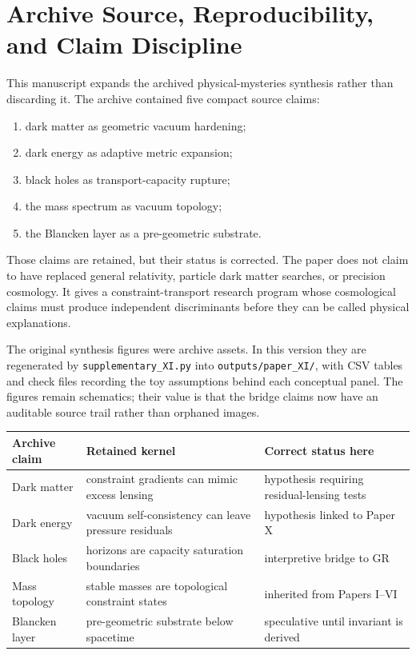\documentclass[11pt]{article}
\begin{document}
\section{Archive Source, Reproducibility, and Claim Discipline}

This manuscript expands the archived physical-mysteries synthesis rather than
discarding it. The archive contained five compact source claims:
\begin{enumerate}
    \item dark matter as geometric vacuum hardening;
    \item dark energy as adaptive metric expansion;
    \item black holes as transport-capacity rupture;
    \item the mass spectrum as vacuum topology;
    \item the Blancken layer as a pre-geometric substrate.
\end{enumerate}
Those claims are retained, but their status is corrected. The paper does not
claim to have replaced general relativity, particle dark matter searches, or
precision cosmology. It gives a constraint-transport research program whose
cosmological claims must produce independent discriminants before they can be
called physical explanations.

The original synthesis figures were archive assets. In this version they are
regenerated by \texttt{supplementary\_XI.py} into
\texttt{outputs/paper\_XI/}, with CSV tables and check files recording the
toy assumptions behind each conceptual panel. The figures remain schematics;
their value is that the bridge claims now have an auditable source trail rather
than orphaned images.

\begin{center}
\begin{tabular}{p{}p{}p{}}
\toprule
\textbf{Archive claim} & \textbf{Retained kernel} & \textbf{Correct status here}\\
\midrule
Dark matter & constraint gradients can mimic excess lensing & hypothesis requiring residual-lensing tests\\
Dark energy & vacuum self-consistency can leave pressure residuals & hypothesis linked to Paper X\\
Black holes & horizons are capacity saturation boundaries & interpretive bridge to GR\\
Mass topology & stable masses are topological constraint states & inherited from Papers I--VI\\
Blancken layer & pre-geometric substrate below spacetime & speculative until invariant is derived\\
\bottomrule
\end{tabular}
\end{center}
\end{document}
